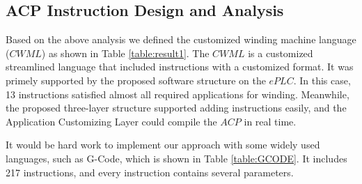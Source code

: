 \documentclass[journal]{IEEEtran}
\begin{document}
\subsection{ACP Instruction Design and Analysis}
Based on the above analysis we defined the customized winding machine language ($CWML$) as shown in Table \ref{table:result1}. The $CWML$ is a customized streamlined language that included instructions with a customized format. It was primely supported by the proposed software structure on the $ePLC$. In this case, 13 instructions satisfied almost all required applications for winding. Meanwhile, the proposed three-layer structure supported adding instructions easily, and the Application Customizing Layer could compile the $ACP$ in real time. 

It would be hard work to implement our approach with some widely used languages, such as G-Code, which is shown in Table \ref{table:GCODE}. It includes 217 instructions, and every instruction contains several parameters. 
\end{document}
